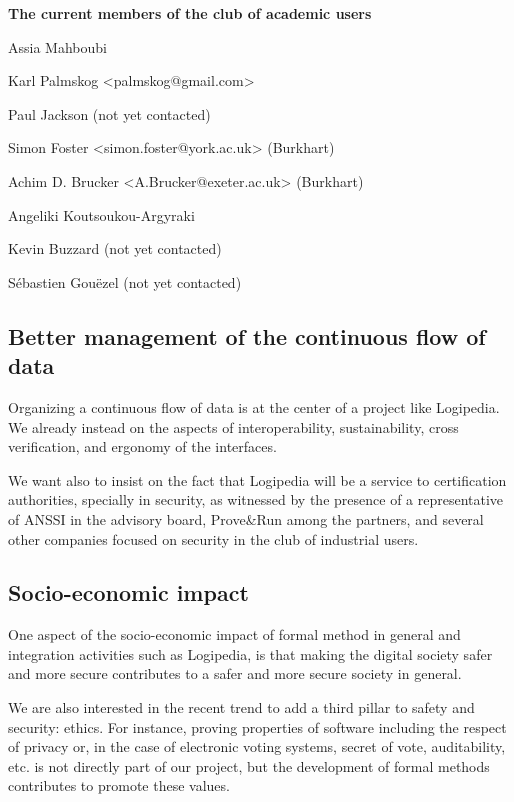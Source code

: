 \begin{framed}
\begin{center}
  {\bf \Large The current members of the club of academic users}
\end{center}
  
Assia Mahboubi
  
Karl Palmskog <palmskog@gmail.com> 

Paul Jackson (not yet contacted)

Simon Foster <simon.foster@york.ac.uk> (Burkhart)

Achim D. Brucker <A.Brucker@exeter.ac.uk> (Burkhart)

Angeliki Koutsoukou-Argyraki 

Kevin Buzzard (not yet contacted)

Sébastien Gouëzel (not yet contacted)
\end{framed}

\subsection{Better management of the continuous flow of data}

Organizing a continuous flow of data is at the center of a project
like Logipedia. We already instead on the aspects of interoperability,
sustainability, cross verification, and ergonomy of the interfaces.

We want also to insist on the fact that Logipedia will be a service to
certification authorities, specially in security, as witnessed by the
presence of a representative of ANSSI in the advisory board,
Prove\&Run among the partners, and several other companies focused on
security in the club of industrial users.

\subsection{Socio-economic impact}

One aspect of the socio-economic impact of formal method in general
and integration activities such as Logipedia, is that making the 
digital society safer and more secure contributes to a safer and more 
secure society in general.

We are also interested in the recent trend to add a third pillar to
safety and security: ethics. For instance, proving properties of
software including the respect of privacy or, in the case of
electronic voting systems, secret of vote, auditability, etc.  is not
directly part of our project, but the development of formal methods
contributes to promote these values.

